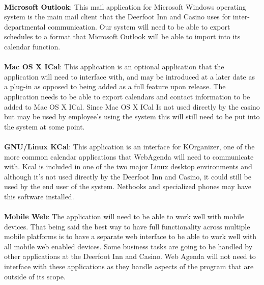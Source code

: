 \documentclass[letterpaper,12pt]{report}
\begin{document}
\paragraph*{}\hspace{0.6cm}\textbf{Microsoft Outlook}: This mail application for Microsoft Windows operating system is the main mail client that the Deerfoot Inn and Casino uses for inter-departmental communication. Our system will need to be able to export schedules to a format that  Microsoft Outlook will be able to import into its calendar function.
\paragraph*{}\hspace{0.6cm}\textbf{Mac OS X ICal}: This application is an optional application that the application will need to interface with, and may be introduced at a later date as a plug-in as opposed to being added as a full feature upon release. The application needs to be able to export calendars and contact information to be added to Mac OS X ICal. Since Mac OS X ICal Is not used directly by the casino but may be used by employee’s using the system this will still need to be put into the system at some point.
\paragraph*{}\hspace{0.6cm}\textbf{GNU/Linux KCal}: This application is an interface for KOrganizer, one of the more common calendar applications that WebAgenda will need to communicate with. Kcal is included in one of the two major Linux desktop environments and although it’s not used directly by the Deerfoot Inn and Casino, it could still be used by the end user of the system. Netbooks and specialized phones may have this software installed.
\newpage

\paragraph*{}\hspace{0.6cm}\textbf{Mobile Web}: The application will need to be able to work well with mobile devices. That being said the best way to have full functionality across multiple mobile platforms is to have a separate web interface to be able to work well with all mobile web enabled devices. 
Some business tasks are going to be handled by other applications at the Deerfoot Inn and Casino. Web Agenda will not need to interface with these applications as they handle aspects of the program that are outside of its scope.
\end{document}
